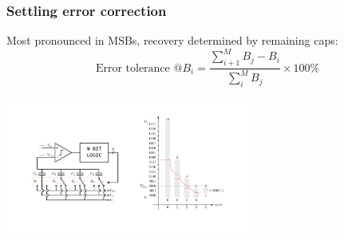 \documentclass[aspectratio=169]{beamer}
\begin{document}
\begin{frame}
\frametitle{Settling error correction}
Most pronounced in MSBs, recovery determined by remaining caps:
\begin{equation*}
\textrm{Error tolerance @} B_i = \frac{\sum_{i+1}^{M}B_j - B_i} {\sum_{i}^{M}B_j} \times 100 \%
\end{equation*}
\begin{center}
\includegraphics[width=0.6\textwidth]{tranchar2.pdf}
\end{center}
\end{frame}


\end{document}
